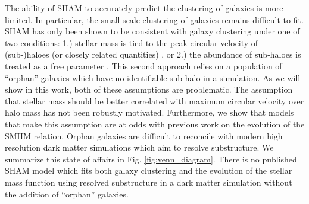 \documentclass[a4paper,fleqn,usenatbib]{mnras}
\begin{document}
The ability of SHAM to accurately predict the clustering of galaxies is more limited.  In particular, the small scale clustering of galaxies remains difficult to fit.  SHAM has only been shown to be consistent with galaxy clustering under one of two conditions: 1.) stellar mass is tied to the peak circular velocity of (sub-)haloes (or closely related quantities) \citep{Reddick:2013gi, Hearin:2014hh, Lehmann:2015vi}, or 2.) the abundance of sub-haloes is treated as a free parameter \citep{Wang:2006fe, Wang:2010ho, Guo:2010do, Moster:2010ep, Yang:2012ew}.  This second approach relies on a population of ``orphan'' galaxies which have no identifiable sub-halo in a simulation.  As we will show in this work, both of these assumptions are problematic.  The assumption that stellar mass should be better correlated with maximum circular velocity over halo mass has not been robustly motivated.  Furthermore, we show that models that make this assumption are at odds with previous work on the evolution of the SMHM relation.  Orphan galaxies are difficult to reconcile with modern high resolution dark matter simulations which aim to resolve substructure.  We summarize this state of affairs in Fig. \ref{fig:venn_diagram}.  There is no published SHAM model which fits both galaxy clustering and the evolution of the stellar mass function using resolved substructure in a dark matter simulation without the addition of ``orphan'' galaxies.
\end{document}
